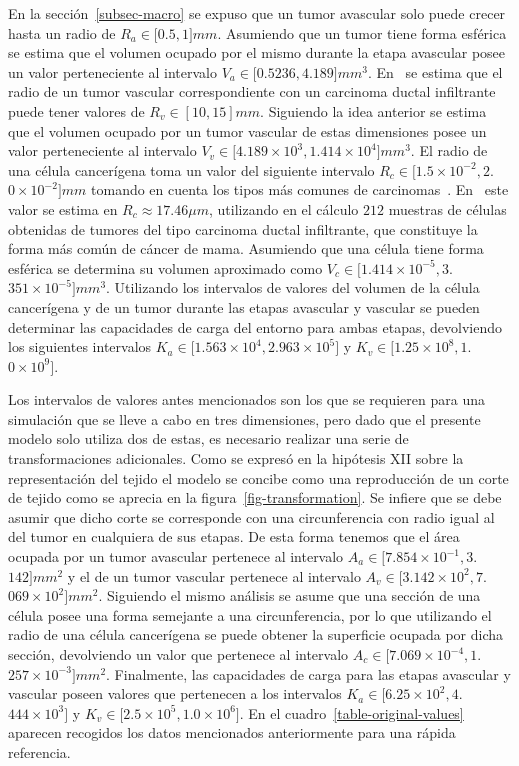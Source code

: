 En la secci\'on~\ref{subsec-macro} se expuso que un tumor avascular solo puede crecer hasta un radio de $R_a \in [0$.$5, 1]mm$. Asumiendo que un tumor tiene forma esf\'erica se estima que el volumen ocupado por el mismo durante la etapa avascular posee un valor perteneciente al intervalo $V_a \in [0$.$5236, 4$.$189]mm^3$. En~\cite{breastdata,chile} se estima que el radio de un tumor vascular correspondiente con un carcinoma ductal infiltrante puede tener valores de $R_v \in [10, 15]mm$. Siguiendo la idea anterior se estima que el volumen ocupado por un tumor vascular de estas dimensiones posee un valor perteneciente al intervalo $V_v \in [4$.$189 \times 10^3, 1$.$414 \times 10^4]mm^3$. El radio de una c\'elula cancer\'igena toma un valor del siguiente intervalo $R_c \in [1$.$5 \times 10^{-2}, 2$.$0 \times 10^{-2}]mm$ tomando en cuenta los tipos m\'as comunes de carcinomas~\cite{kansal3,breastdata,vajtai}. En~\cite{wisconsin} este valor se estima en $R_c \approx 17$.$46 \mu m$, utilizando en el c\'alculo $212$ muestras de c\'elulas obtenidas de tumores del tipo carcinoma ductal infiltrante, que constituye la forma m\'as com\'un de c\'ancer de mama. Asumiendo que una c\'elula tiene forma esf\'erica se determina su volumen aproximado como $V_{c} \in [1$.$414 \times 10^{-5}, 3$.$351 \times 10^{-5}]mm^3$. Utilizando los intervalos de valores del volumen de la c\'elula cancer\'igena y de un tumor durante las etapas avascular y vascular se pueden determinar las capacidades de carga del entorno para ambas etapas, devolviendo los siguientes intervalos $K_a \in [1$.$563 \times 10^4, 2$.$963 \times 10^5]$ y $K_v \in [1$.$25 \times 10^8, 1$.$0 \times 10^9]$. 

Los intervalos de valores antes mencionados son los que se requieren para una simulaci\'on que se lleve a cabo en tres dimensiones, pero dado que el presente modelo solo utiliza dos de estas, es necesario realizar una serie de transformaciones adicionales. Como se expres\'o en la hip\'otesis XII sobre la representaci\'on del tejido el modelo se concibe como una reproducci\'on de un corte de tejido como se aprecia en la figura~\ref{fig-transformation}. Se infiere que se debe asumir que dicho corte se corresponde con una circunferencia con radio igual al del tumor en cualquiera de sus etapas. De esta forma tenemos que el \'area ocupada por un tumor avascular pertenece al intervalo $A_a \in [7$.$854 \times 10^{-1}, 3$.$142]mm^2$ y el de un tumor vascular pertenece al intervalo $A_v \in [3$.$142 \times 10^2, 7$.$069 \times 10^2]mm^2$. Siguiendo el mismo an\'alisis se asume que una secci\'on de una c\'elula posee una forma semejante a una circunferencia, por lo que utilizando el radio de una c\'elula cancer\'igena se puede obtener la superficie ocupada por dicha secci\'on, devolviendo un valor que pertenece al intervalo $A_c \in [7$.$069 \times 10^{-4}, 1$.$257 \times 10^{-3}]mm^2$. Finalmente, las capacidades de carga para las etapas avascular y vascular poseen valores que pertenecen a los intervalos $K_a \in [6$.$25 \times 10^2, 4$.$444 \times 10^3]$ y $K_v \in [2$.$5 \times 10^5, 1$.$0 \times 10^6]$. En el cuadro~\ref{table-original-values} aparecen recogidos los datos mencionados anteriormente para una r\'apida referencia.

